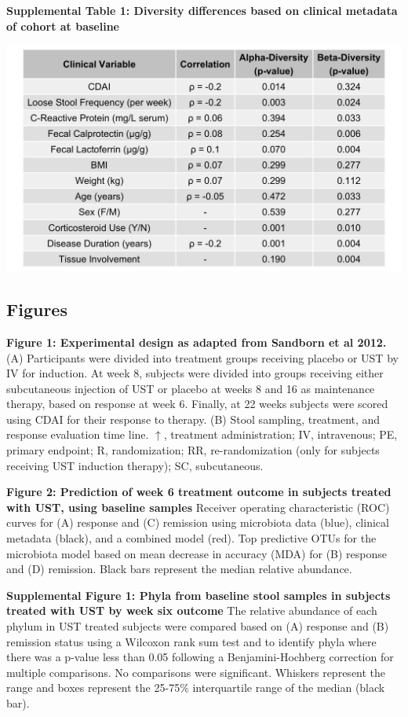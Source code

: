 \documentclass[12pt,]{article}
\begin{document}
\newpage

\textbf{Supplemental Table 1: Diversity differences based on clinical
metadata of cohort at baseline}

\includegraphics{tables/Supp.table1_cohortdiversity.png}

\newpage

\subsection{Figures}\label{figures}

\textbf{Figure 1: Experimental design as adapted from Sandborn et al
2012.} (A) Participants were divided into treatment groups receiving
placebo or UST by IV for induction. At week 8, subjects were divided
into groups receiving either subcutaneous injection of UST or placebo at
weeks 8 and 16 as maintenance therapy, based on response at week 6.
Finally, at 22 weeks subjects were scored using CDAI for their response
to therapy. (B) Stool sampling, treatment, and response evaluation time
line. \(\uparrow\), treatment administration; IV, intravenous; PE,
primary endpoint; R, randomization; RR, re-randomization (only for
subjects receiving UST induction therapy); SC, subcutaneous.

\textbf{Figure 2: Prediction of week 6 treatment outcome in subjects
treated with UST, using baseline samples} Receiver operating
characteristic (ROC) curves for (A) response and (C) remission using
microbiota data (blue), clinical metadata (black), and a combined model
(red). Top predictive OTUs for the microbiota model based on mean
decrease in accuracy (MDA) for (B) response and (D) remission. Black
bars represent the median relative abundance.

\textbf{Supplemental Figure 1: Phyla from baseline stool samples in
subjects treated with UST by week six outcome} The relative abundance of
each phylum in UST treated subjects were compared based on (A) response
and (B) remission status using a Wilcoxon rank sum test and to identify
phyla where there was a p-value less than 0.05 following a
Benjamini-Hochberg correction for multiple comparisons. No comparisons
were significant. Whiskers represent the range and boxes represent the
25-75\% interquartile range of the median (black bar).
\end{document}
